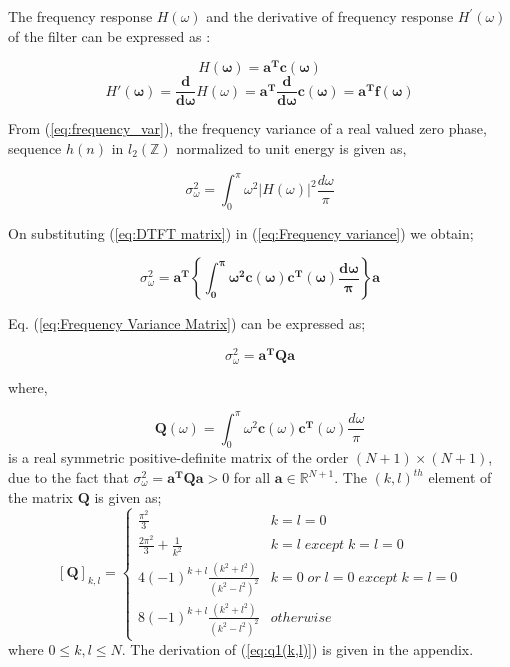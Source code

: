 The frequency response $H(\omega)$ and the derivative of frequency response
$H^{'}(\omega)$ of the filter can be expressed as :

\begin{equation}
H\mathbf{(\omega)=a^{T}c(\omega)}\label{eq:DTFT matrix}\end{equation}
\begin{equation}
H\mathbf{'(\omega)=\frac{d}{d\omega}}H(\omega)\mathbf{=a^{T}\frac{d}{d\omega}c(\omega)=a^{\mathbf{T}}}\mathbf{f(\omega)}\label{eq:Derivative DTFT}\end{equation}

From (\ref{eq:frequency_var}), the frequency variance of a real valued zero
phase, sequence $h(n)$ in $l_{2}(\mathbb{Z})$ normalized to unit
energy is given as,

\begin{equation}
\label{eq:Frequency variance}
\sigma_{\omega}^{2}=\int_{0}^{\pi}\omega^{2}|H(\omega)|^{2}\frac{d\omega}{\pi}
\end{equation}


On substituting (\ref{eq:DTFT matrix}) in (\ref{eq:Frequency variance})
we obtain;

\begin{equation}
\sigma_{\omega}^{2}=\mathbf{a^{T}\left\{ \int_{0}^{\pi}\omega^{2}c(\omega)c^{T}(\omega)\frac{d\omega}{\pi}\right\} a}\label{eq:Frequency Variance Matrix}\end{equation}


Eq. (\ref{eq:Frequency Variance Matrix}) can be expressed as;

\begin{equation}
\sigma_{\omega}^{2}=\mathbf{a^{T}}\mathbf{Q}\mathbf{a}\label{eq:FrequencyVarianceMatrixForm}\end{equation}


where,

\begin{equation}
\mathbf{Q}(\omega)=\int_{0}^{\pi}\omega^{2}\mathbf{c}(\omega)\mathbf{c}^{\mathbf{T}}(\omega)\frac{d\omega}{\pi}\label{eq:MatrixFrequencyVariance}\end{equation}
 is a real symmetric positive-definite matrix of the order $(N+1)\times(N+1)$, due to the fact that $\sigma_{\omega}^{2}=\mathbf{a^{T}Qa>} 0$ for all $\mathbf{a}\in\mathbb{R}^{N+1}$. The $(k,l)^{th}$ element of the matrix $\mathbf{Q}$ is given as;
\begin{equation}
\label{eq:q1(k,l)}
[\mathbf{Q}]_{k,l}=\begin{cases}
\frac{\pi^{2}}{3} & k=l=0\\
\frac{2 \pi ^{2}}{3}+\frac{1}{k^2} & k=l\; except\; k=l=0\\
4(-1)^{k+l}\frac{(k^{2}+l^{2})}{(k^{2}-l^{2})^{2}} & k=0\; or\; l=0\; except\; k=l=0\\
8(-1)^{k+l}\frac{(k^{2}+l^{2})}{(k^{2}-l^{2})^{2}} & otherwise
\end{cases}
\end{equation}
where $0\le k,l\le N$.
The derivation of (\ref{eq:q1(k,l)}) is given in the appendix.

